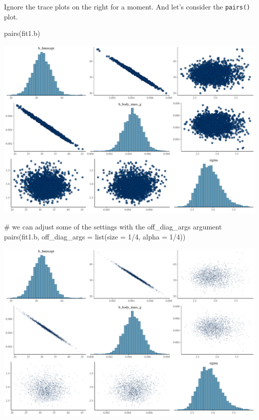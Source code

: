 \documentclass[
  letterpaper,
  DIV=11,
  numbers=noendperiod]{scrartcl}
\newenvironment{Shaded}{\begin{snugshade}}{\end{snugshade}}
\newcommand{\AttributeTok}[1]{\textcolor[rgb]{0.40,0.45,0.13}{#1}}
\newcommand{\CommentTok}[1]{\textcolor[rgb]{0.37,0.37,0.37}{#1}}
\newcommand{\DecValTok}[1]{\textcolor[rgb]{0.68,0.00,0.00}{#1}}
\newcommand{\FunctionTok}[1]{\textcolor[rgb]{0.28,0.35,0.67}{#1}}
\newcommand{\NormalTok}[1]{\textcolor[rgb]{0.00,0.23,0.31}{#1}}
\newcommand{\SpecialCharTok}[1]{\textcolor[rgb]{0.37,0.37,0.37}{#1}}
\begin{document}
Ignore the trace plots on the right for a moment. And let's consider the
\texttt{pairs()} plot.

\begin{Shaded}
\begin{Highlighting}[]
\FunctionTok{pairs}\NormalTok{(fit1.b)}
\end{Highlighting}
\end{Shaded}

\includegraphics{Bayes_Lab_1_files/figure-pdf/unnamed-chunk-38-1.pdf}

\begin{Shaded}
\begin{Highlighting}[]
\CommentTok{\# we can adjust some of the settings with the off\_diag\_args argument}
\FunctionTok{pairs}\NormalTok{(fit1.b, }\AttributeTok{off\_diag\_args =} \FunctionTok{list}\NormalTok{(}\AttributeTok{size =} \DecValTok{1}\SpecialCharTok{/}\DecValTok{4}\NormalTok{, }\AttributeTok{alpha =} \DecValTok{1}\SpecialCharTok{/}\DecValTok{4}\NormalTok{))}
\end{Highlighting}
\end{Shaded}

\includegraphics{Bayes_Lab_1_files/figure-pdf/unnamed-chunk-38-2.pdf}
\end{document}
